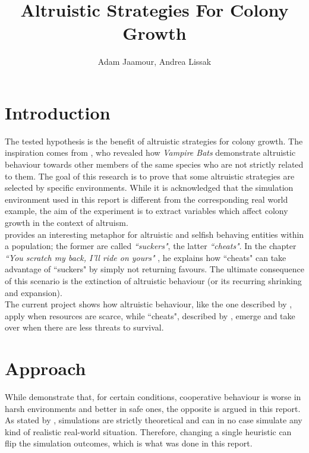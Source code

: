 \documentclass[a4paper,12pt,twocolumn]{article}
\title{Altruistic Strategies For Colony Growth}
\author{Adam Jaamour, Andrea Lissak}
\begin{document}
\maketitle
\clearpage

\section{Introduction}
The tested hypothesis is the benefit of altruistic strategies for colony growth. The inspiration comes from \citet{bats}, who revealed how \textit{Vampire Bats} demonstrate altruistic behaviour towards other members of the same species who are not strictly related to them. The goal of this research is to prove that some altruistic strategies are selected by specific environments. While it is acknowledged that the simulation environment used in this report is different from the corresponding real world example, the aim of the experiment is to extract variables which affect colony growth in the context of altruism.\\

\citet{dawkins} provides an interesting metaphor for altruistic and selfish behaving entities within a population; the former are called \textit{``suckers"}, the latter \textit{``cheats"}. In the chapter \textit{``You scratch my back, I'll ride on yours"} \cite[p. 165]{dawkins}, he explains how ``cheats" can take advantage of ``suckers" by simply not returning favours. The ultimate consequence of this scenario is the extinction of altruistic behaviour (or its recurring shrinking and expansion).\\

The current project shows how altruistic behaviour, like the one described by \citet{bats}, apply when resources are scarce, while ``cheats", described by \citet{dawkins}, emerge and take over when there are less threats to survival.


\section{Approach}
While \citet{smaldino} demonstrate that, for certain conditions, cooperative behaviour is worse in harsh environments and better in safe ones, the opposite is argued in this report. As stated by \citet[p. 312]{bryson}, simulations are strictly theoretical and can in no case simulate any kind of realistic real-world situation. Therefore, changing a single heuristic  can flip the simulation outcomes, which is what was done in this report.\\
\end{document}
